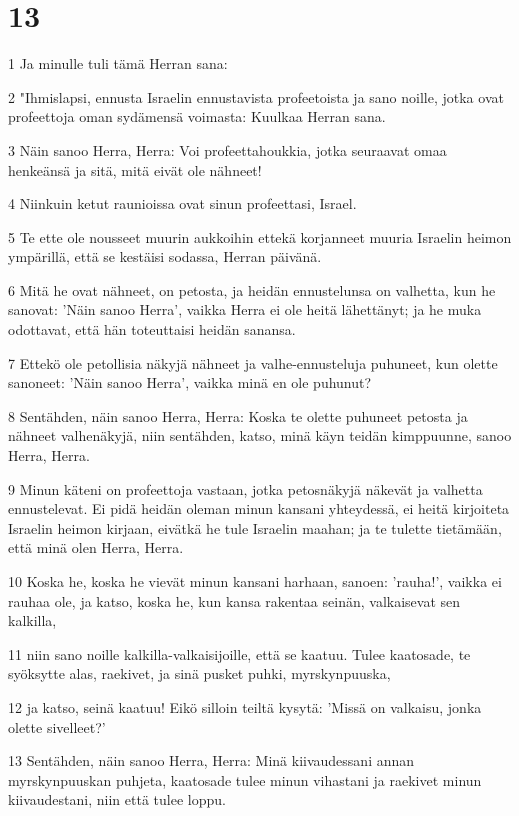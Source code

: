 \chapter{13}

\par 1 Ja minulle tuli tämä Herran sana:
\par 2 "Ihmislapsi, ennusta Israelin ennustavista profeetoista ja sano noille, jotka ovat profeettoja oman sydämensä voimasta: Kuulkaa Herran sana.
\par 3 Näin sanoo Herra, Herra: Voi profeettahoukkia, jotka seuraavat omaa henkeänsä ja sitä, mitä eivät ole nähneet!
\par 4 Niinkuin ketut raunioissa ovat sinun profeettasi, Israel.
\par 5 Te ette ole nousseet muurin aukkoihin ettekä korjanneet muuria Israelin heimon ympärillä, että se kestäisi sodassa, Herran päivänä.
\par 6 Mitä he ovat nähneet, on petosta, ja heidän ennustelunsa on valhetta, kun he sanovat: 'Näin sanoo Herra', vaikka Herra ei ole heitä lähettänyt; ja he muka odottavat, että hän toteuttaisi heidän sanansa.
\par 7 Ettekö ole petollisia näkyjä nähneet ja valhe-ennusteluja puhuneet, kun olette sanoneet: 'Näin sanoo Herra', vaikka minä en ole puhunut?
\par 8 Sentähden, näin sanoo Herra, Herra: Koska te olette puhuneet petosta ja nähneet valhenäkyjä, niin sentähden, katso, minä käyn teidän kimppuunne, sanoo Herra, Herra.
\par 9 Minun käteni on profeettoja vastaan, jotka petosnäkyjä näkevät ja valhetta ennustelevat. Ei pidä heidän oleman minun kansani yhteydessä, ei heitä kirjoiteta Israelin heimon kirjaan, eivätkä he tule Israelin maahan; ja te tulette tietämään, että minä olen Herra, Herra.
\par 10 Koska he, koska he vievät minun kansani harhaan, sanoen: 'rauha!', vaikka ei rauhaa ole, ja katso, koska he, kun kansa rakentaa seinän, valkaisevat sen kalkilla,
\par 11 niin sano noille kalkilla-valkaisijoille, että se kaatuu. Tulee kaatosade, te syöksytte alas, raekivet, ja sinä pusket puhki, myrskynpuuska,
\par 12 ja katso, seinä kaatuu! Eikö silloin teiltä kysytä: 'Missä on valkaisu, jonka olette sivelleet?'
\par 13 Sentähden, näin sanoo Herra, Herra: Minä kiivaudessani annan myrskynpuuskan puhjeta, kaatosade tulee minun vihastani ja raekivet minun kiivaudestani, niin että tulee loppu.
